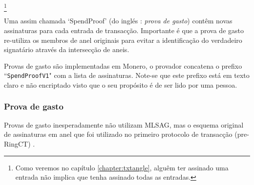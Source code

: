 \footnote{Como veremos no capítulo \ref{chapter:txtangle}, alguêm ter assinado uma entrada não implica que tenha assinado todas as entradas.} 

Uma assim chamada `SpendProof' (do inglés : {\em prova de gasto})  contêm novas assinaturas para cada entrada de transacção. Importante é que a prova de gasto re-utiliza os membros de anel originais para evitar a identificação do verdadeiro signatário através da intersecção de aneis.


Provas de gasto são implementadas em Monero, o provador concatena o prefixo ``{\tt SpendProofV1}" com a lista de assinaturas. Note-se que este prefixo está em texto claro e não encriptado visto que o seu propósito é de ser lido por uma pessoa.
 

\subsubsection*{Prova de gasto}

Provas de gasto inesperadamente não utilizam MLSAG, mas o esquema original de assinaturas em anel que foi utilizado no primeiro protocolo de transacção (pre-RingCT) \cite{cryptoNoteWhitePaper}. 


